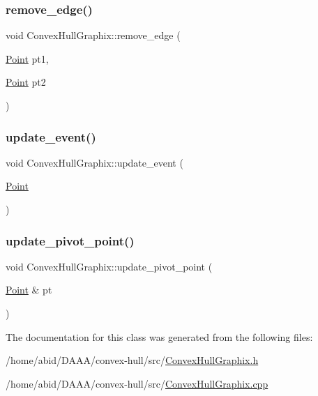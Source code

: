 \subsubsection{\texorpdfstring{remove\_edge()}{remove\_edge()}\hspace{0.1cm}{\footnotesize\ttfamily [2/2]}}
{\footnotesize\ttfamily void Convex\+Hull\+Graphix\+::remove\+\_\+edge (\begin{DoxyParamCaption}\item[{\mbox{\hyperlink{class_point}{Point}}}]{pt1,  }\item[{\mbox{\hyperlink{class_point}{Point}}}]{pt2 }\end{DoxyParamCaption})}

\mbox{\label{class_convex_hull_graphix_a72101c075bb4fca0db552e888d1530b3}} 
\subsubsection{\texorpdfstring{update\_event()}{update\_event()}}
{\footnotesize\ttfamily void Convex\+Hull\+Graphix\+::update\+\_\+event (\begin{DoxyParamCaption}\item[{\mbox{\hyperlink{class_point}{Point}}}]{ }\end{DoxyParamCaption})}

\mbox{\label{class_convex_hull_graphix_a463b42e0cafea416fa9a193e5efed532}} 
\subsubsection{\texorpdfstring{update\_pivot\_point()}{update\_pivot\_point()}}
{\footnotesize\ttfamily void Convex\+Hull\+Graphix\+::update\+\_\+pivot\+\_\+point (\begin{DoxyParamCaption}\item[{\mbox{\hyperlink{class_point}{Point}} \&}]{pt }\end{DoxyParamCaption})}



The documentation for this class was generated from the following files\+:\begin{DoxyCompactItemize}
\item 
/home/abid/\+D\+A\+A\+A/convex-\/hull/src/\mbox{\hyperlink{_convex_hull_graphix_8h}{Convex\+Hull\+Graphix.\+h}}\item 
/home/abid/\+D\+A\+A\+A/convex-\/hull/src/\mbox{\hyperlink{_convex_hull_graphix_8cpp}{Convex\+Hull\+Graphix.\+cpp}}\end{DoxyCompactItemize}
